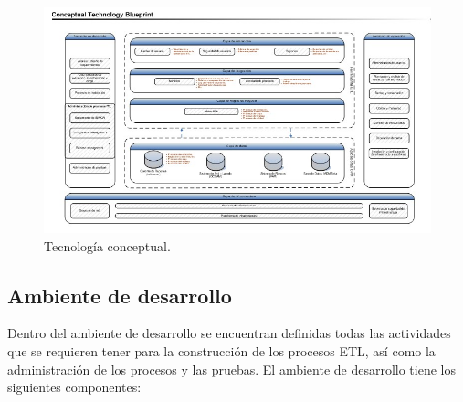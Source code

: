 \begin{figure}[htb]
  \begin{center}
    \includegraphics[width=\linewidth]{Tecnologia_Conceptual.jpg}
        \caption{Tecnología conceptual.}
    \label{fig:conceptual}
  \end{center}
\end{figure}

\subsection{Ambiente de desarrollo}

Dentro del ambiente de desarrollo se encuentran definidas todas las actividades
que se requieren tener para la construcción de los procesos ETL, así como la
administración de los procesos y las pruebas. El ambiente de desarrollo tiene
los siguientes componentes:

